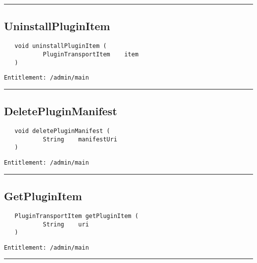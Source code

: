 \rule{12cm}{2pt}
\subsection{UninstallPluginItem}
\label{Api:UninstallPluginItem}
\begin{Verbatim}
   void uninstallPluginItem (
           PluginTransportItem    item
   )
\end{Verbatim}
\begin{Verbatim}[formatcom=\color{Maroon}]
  Entitlement: /admin/main
\end{Verbatim}



\rule{12cm}{2pt}
\subsection{DeletePluginManifest}
\label{Api:DeletePluginManifest}
\begin{Verbatim}
   void deletePluginManifest (
           String    manifestUri
   )
\end{Verbatim}
\begin{Verbatim}[formatcom=\color{Maroon}]
  Entitlement: /admin/main
\end{Verbatim}



\rule{12cm}{2pt}
\subsection{GetPluginItem}
\label{Api:GetPluginItem}
\begin{Verbatim}
   PluginTransportItem getPluginItem (
           String    uri
   )
\end{Verbatim}
\begin{Verbatim}[formatcom=\color{Maroon}]
  Entitlement: /admin/main
\end{Verbatim}



\rule{12cm}{2pt}
